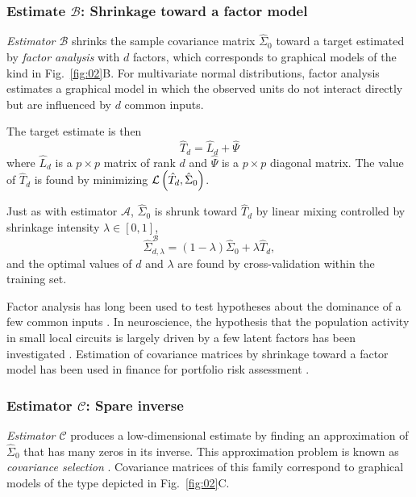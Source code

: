 \subsubsection*{Estimate $\mathcal B$: Shrinkage toward a factor model}
\emph{Estimator $\mathcal B$} shrinks the sample covariance matrix $\hat\Sigma_0$ toward a target estimated by \emph{factor analysis} with $d$ factors, which corresponds to graphical models of the kind in Fig.~\ref{fig:02}B. For multivariate normal distributions, factor analysis estimates a graphical model in which the observed units do not interact directly but are influenced by $d$ common inputs.

The target estimate is then 
\begin{equation}
\hat T_d = \hat L_d + \hat \Psi
\end{equation}
where $\hat L_d$ is a $p\times p$ matrix of rank $d$ and $\hat \Psi$ is a $p\times p$ diagonal matrix. The value of $\hat T_d$ is found by minimizing $\mathcal L\left(\hat T_d, \hat\Sigma_0\right)$. 

Just as with estimator $\mathcal A$, $\hat\Sigma_0$ is shrunk toward $\hat T_d$ by linear mixing controlled by shrinkage intensity $\lambda\in[0,1]$,
\begin{equation}
\hat\Sigma_{d,\lambda}^\mathcal{B} = (1-\lambda)\hat\Sigma_0 + \lambda\hat T_d,
\end{equation}
and the optimal values of $d$ and $\lambda$ are found by cross-validation within the training set.

Factor analysis has long been used to test hypotheses about the dominance of a few common inputs \cite{findagoodone}.  In neuroscience, the hypothesis that the population activity in small local circuits is largely driven by a few latent factors has been investigated \cite{Yu:2009,Ecker:2013}.  Estimation of covariance matrices by shrinkage toward a factor model has been used in finance for portfolio risk assessment \cite{Ledoit:2003,Fan:2008}.

\subsubsection*{Estimator $\mathcal C$: Spare inverse}
\emph{Estimator $\mathcal C$} produces a low-dimensional estimate by finding an approximation of $\hat\Sigma_0$ that has many zeros in its inverse. This approximation problem is known as \emph{covariance selection} \cite{Dempster:1972}.  Covariance matrices of this family correspond to graphical models of the type depicted in Fig.~\ref{fig:02}C.

